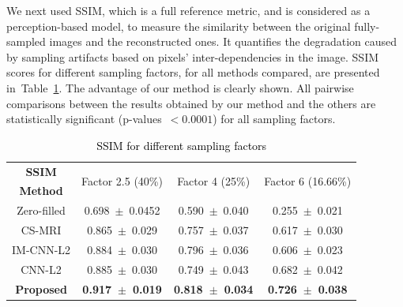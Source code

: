 \documentclass[review]{elsarticle}
\begin{document}
We next used SSIM, which is a full reference metric, and is considered as a perception-based model, to measure the similarity between the original fully-sampled images and the reconstructed ones.
It quantifies the degradation caused by sampling artifacts based on pixels' inter-dependencies in the image. 
SSIM scores for different sampling factors, for all methods compared, are presented in~Table~\ref{tbl:SSIM_NO_MASK}. The advantage of our method is clearly shown. All pairwise comparisons between the results obtained by our method and the others are statistically significant (p-values~$<0.0001$) for all sampling factors.

\begin{table}[H]
	\centering{}
	\begin{tabular}{|c||c||c||c|}
		\hline 
		\textbf{SSIM} & \multicolumn{1}{c||}{\multirow{2}{*}{Factor 2.5 (40\%)}} & \multicolumn{1}{c||}{\multirow{2}{*}{Factor 4 (25\%)}} & \multicolumn{1}{c|}{\multirow{2}{*}{Factor 6 (16.66\%)}} \tabularnewline
		\textbf{Method} & \multicolumn{1}{c||}{} & \multicolumn{1}{c||}{} & \multicolumn{1}{c|}{} \tabularnewline \cline{1-4}
		
		Zero-filled         &0.698~$\pm$~0.0452  &0.590~$\pm$~0.040   &0.255~$\pm$~0.021\tabularnewline
		CS-MRI              &0.865~$\pm$~0.029  &0.757~$\pm$~0.037   &0.617~$\pm$~0.030\tabularnewline
		IM-CNN-L2           &0.884~$\pm$~0.030  &0.796~$\pm$~0.036   &0.606~$\pm$~0.023\tabularnewline
		CNN-L2              &0.885~$\pm$~0.030  &0.749~$\pm$~0.043   &0.682~$\pm$~0.042\tabularnewline
		\textbf{Proposed}   &\textbf{0.917~$\pm$~0.019}  &\textbf{0.818~$\pm$~0.034}   &\textbf{0.726~$\pm$~0.038}\tabularnewline
		\hline 
	\end{tabular}\caption{\textcolor{black}{\footnotesize{}{}SSIM for different sampling factors}{\footnotesize{}\label{tbl:SSIM_NO_MASK}}}
\end{table}
\end{document}
